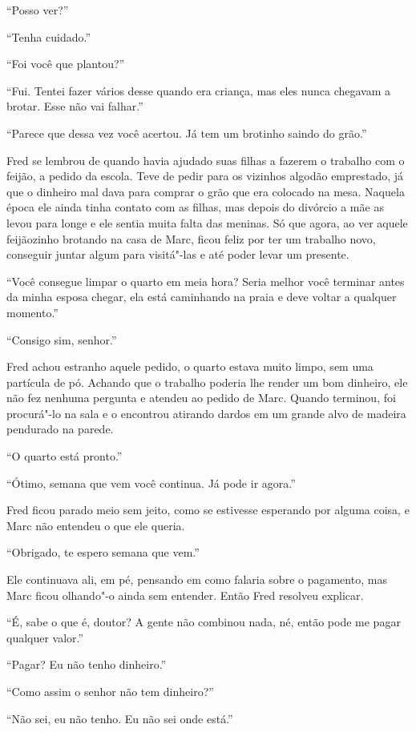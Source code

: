``Posso ver?''

``Tenha cuidado.''

``Foi você que plantou?''

``Fui. Tentei fazer vários desse quando era criança, mas eles nunca
chegavam a brotar. Esse não vai falhar.''

``Parece que dessa vez você acertou. Já tem um brotinho saindo do
grão.''

Fred se lembrou de quando havia ajudado suas filhas a fazerem o trabalho
com o feijão, a pedido da escola. Teve de pedir para os vizinhos algodão
emprestado, já que o dinheiro mal dava para comprar o grão que era
colocado na mesa. Naquela época ele ainda tinha contato com as filhas,
mas depois do divórcio a mãe as levou para longe e ele sentia muita
falta das meninas. Só que agora, ao ver aquele feijãozinho brotando na
casa de Marc, ficou feliz por ter um trabalho novo, conseguir juntar
algum para visitá"-las e até poder levar um presente.

``Você consegue limpar o quarto em meia hora? Seria melhor você terminar
antes da minha esposa chegar, ela está caminhando na praia e deve voltar
a qualquer momento.''

``Consigo sim, senhor.''

Fred achou estranho aquele pedido, o quarto estava muito limpo, sem uma
partícula de pó. Achando que o trabalho poderia lhe render um bom
dinheiro, ele não fez nenhuma pergunta e atendeu ao pedido de Marc.
Quando terminou, foi procurá"-lo na sala e o encontrou atirando dardos em
um grande alvo de madeira pendurado na parede.

``O quarto está pronto.''

``Ótimo, semana que vem você continua. Já pode ir agora.''

Fred ficou parado meio sem jeito, como se estivesse esperando por alguma
coisa, e Marc não entendeu o que ele queria.

``Obrigado, te espero semana que vem.''

Ele continuava ali, em pé, pensando em como falaria sobre o pagamento,
mas Marc ficou olhando"-o ainda sem entender. Então Fred resolveu
explicar.

``É, sabe o que é, doutor? A gente não combinou nada, né, então pode me
pagar qualquer valor.''

``Pagar? Eu não tenho dinheiro.''

``Como assim o senhor não tem dinheiro?''

``Não sei, eu não tenho. Eu não sei onde está.''

